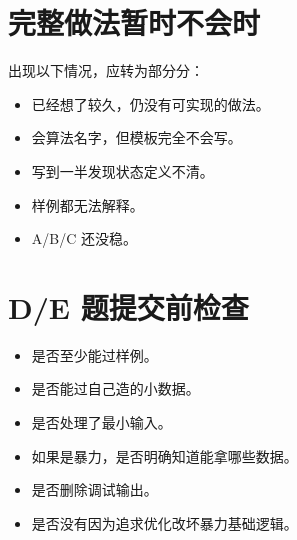 \section{完整做法暂时不会时}\label{sec:08-19}

出现以下情况，应转为部分分：

\begin{itemize}
  \item 已经想了较久，仍没有可实现的做法。
  \item 会算法名字，但模板完全不会写。
  \item 写到一半发现状态定义不清。
  \item 样例都无法解释。
  \item A/B/C 还没稳。
\end{itemize}

\section{D/E 题提交前检查}\label{sec:08-20}

\begin{itemize}
  \item 是否至少能过样例。
  \item 是否能过自己造的小数据。
  \item 是否处理了最小输入。
  \item 如果是暴力，是否明确知道能拿哪些数据。
  \item 是否删除调试输出。
  \item 是否没有因为追求优化改坏暴力基础逻辑。
\end{itemize}
